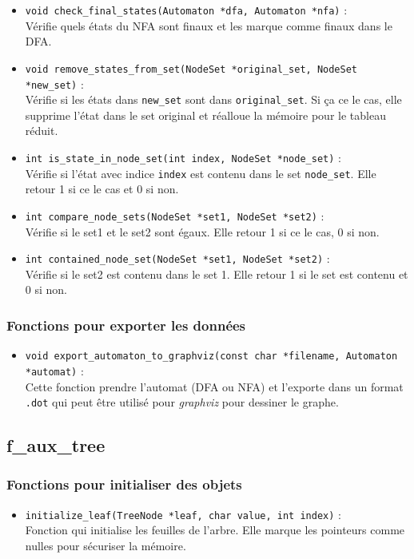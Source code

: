 \documentclass[12pt]{article}
\begin{document}
\begin{itemize}
  \item \lstinline|void check_final_states(Automaton *dfa, Automaton *nfa)| : \\
  Vérifie quels états du NFA sont finaux et les marque comme finaux dans le DFA.
  \item \lstinline|void remove_states_from_set(NodeSet *original_set, NodeSet *new_set)| : \\
  Vérifie si les états dans \texttt{new\_set} sont dans \texttt{original\_set}. Si ça ce le cas, elle supprime l'état dans le set original et réalloue la mémoire pour le tableau réduit.
  \item \lstinline|int is_state_in_node_set(int index, NodeSet *node_set)| : \\
  Vérifie si l'état avec indice \texttt{index} est contenu dans le set \texttt{node\_set}. Elle retour 1 si ce le cas et 0 si non.
  \item \lstinline|int compare_node_sets(NodeSet *set1, NodeSet *set2)| : \\
  Vérifie si le set1 et le set2 sont égaux. Elle retour 1 si ce le cas, 0 si non.
  \item \lstinline|int contained_node_set(NodeSet *set1, NodeSet *set2)| : \\
  Vérifie si le set2 est contenu dans le set 1. Elle retour 1 si le set est contenu et 0 si non.
\end{itemize}

\subsubsection{Fonctions pour exporter les données}
\begin{itemize}
  \item \lstinline|void export_automaton_to_graphviz(const char *filename, Automaton *automat)| : \\
  Cette fonction prendre l'automat (DFA ou NFA) et l'exporte dans un format \texttt{.dot} qui peut être utilisé pour \textit{graphviz} pour dessiner le graphe.
\end{itemize}


\subsection{f\_aux\_tree}
\label{sec:auxs_tree}
\subsubsection{Fonctions pour initialiser des objets}
\begin{itemize}
  \item \lstinline|initialize_leaf(TreeNode *leaf, char value, int index)| : \\
  Fonction qui initialise les feuilles de l'arbre. Elle marque les pointeurs comme nulles pour sécuriser la mémoire.
\end{itemize}
\end{document}
